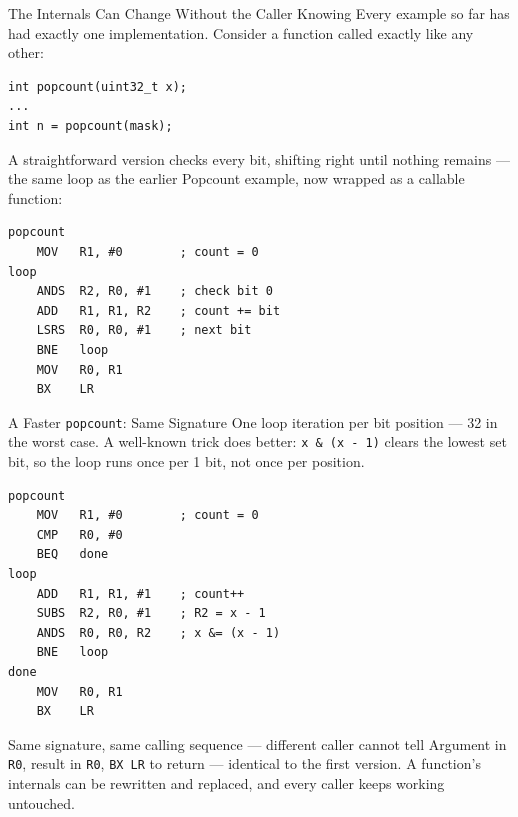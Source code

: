 \documentclass[9pt,aspectratio=169,xcolor=table]{beamer}
\begin{document}
\begin{frame}[fragile]{The Internals Can Change Without the Caller Knowing}
    \leavevmode
    {\small Every example so far has had exactly one implementation. Consider
    a function called exactly like any other:}

    \begin{lstlisting}[style=myc]
int popcount(uint32_t x);
...
int n = popcount(mask);
    \end{lstlisting}

    \vspace{2mm}
    {\small A straightforward version checks every bit, shifting right until
    nothing remains --- the same loop as the earlier Popcount example, now
    wrapped as a callable function:}

    \begin{lstlisting}[style=armasm, language=ARM, basicstyle=\small\ttfamily]
popcount
    MOV   R1, #0        ; count = 0
loop
    ANDS  R2, R0, #1    ; check bit 0
    ADD   R1, R1, R2    ; count += bit
    LSRS  R0, R0, #1    ; next bit
    BNE   loop
    MOV   R0, R1
    BX    LR
    \end{lstlisting}
\end{frame}

\begin{frame}[fragile]{A Faster \texttt{popcount}: Same Signature}
    \leavevmode
    {\small One loop iteration per \alert{bit position} --- 32 in the worst
    case. A well-known trick does better: \texttt{x \& (x - 1)} clears the
    \alert{lowest set bit}, so the loop runs once per 1 bit, not once per
    position.}

    \vspace{1mm}
    \begin{lstlisting}[style=armasm, language=ARM, basicstyle=\small\ttfamily]
popcount
    MOV   R1, #0        ; count = 0
    CMP   R0, #0
    BEQ   done
loop
    ADD   R1, R1, #1    ; count++
    SUBS  R2, R0, #1    ; R2 = x - 1
    ANDS  R0, R0, R2    ; x &= (x - 1)
    BNE   loop
done
    MOV   R0, R1
    BX    LR
    \end{lstlisting}

\begin{block}{Same signature, same calling sequence --- different caller cannot tell}
    Argument in \texttt{R0}, result in \texttt{R0}, \texttt{BX LR} to return
    --- identical to the first version. A function's internals can be
    rewritten and replaced, and every caller keeps working untouched.
\end{block}
\end{frame}
\end{document}

